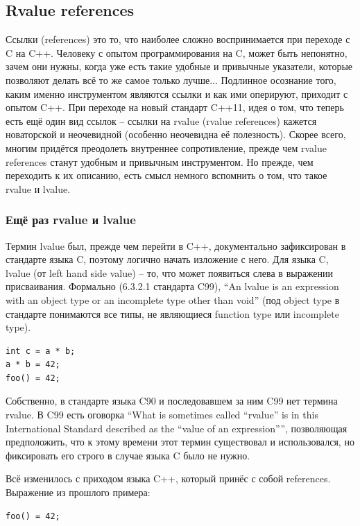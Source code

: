 \documentclass[a4paper,12pt,oneside]{article}
\begin{document}
\subsection{Rvalue references}

Ссылки (references) это то, что наиболее сложно воспринимается при переходе с C на C++. Человеку с опытом программирования на C, может быть непонятно, зачем они нужны, когда уже есть такие удобные и привычные указатели, которые позволяют делать всё то же самое только лучше... Подлинное осознание того, каким именно инструментом являются ссылки и как ими оперируют, приходит с опытом C++. При переходе на новый стандарт C++11, идея о том, что теперь есть ещё один вид ссылок -- ссылки на rvalue (rvalue references) кажется новаторской и неочевидной (особенно неочевидна её полезность). Скорее всего, многим придётся преодолеть внутреннее сопротивление, прежде чем rvalue references станут удобным и привычным инструментом. Но прежде, чем переходить к их описанию, есть смысл немного вспомнить о том, что такое rvalue и lvalue.

\subsubsection{Ещё раз rvalue и lvalue}

Термин lvalue был, прежде чем перейти в C++, документально зафиксирован в стандарте языка C, поэтому логично начать изложение с него. Для языка C, lvalue (от left hand side value) -- то, что может появиться слева в выражении присваивания. Формально (6.3.2.1 стандарта C99), ``An lvalue is an expression with an object type or an incomplete type other than void'' (под object type в стандарте понимаются все типы, не являющиеся function type или incomplete type).

\begin{lstlisting}
int c = a * b;
a * b = 42;
foo() = 42;
\end{lstlisting}

Собственно, в стандарте языка C90 и последовавшем за ним C99 нет термина rvalue. В C99 есть оговорка ``What is sometimes called ``rvalue'' is in this International Standard described as the ``value of an expression'''', позволяющая предположить, что к этому времени этот термин существовал и использовался, но фиксировать его строго в случае языка C было не нужно.

Всё изменилось с приходом языка C++, который принёс с собой references. Выражение из прошлого примера:

\begin{lstlisting}
foo() = 42;
\end{lstlisting}
\end{document}
